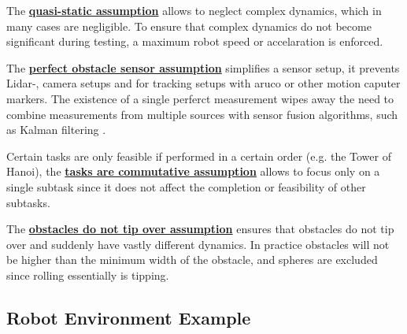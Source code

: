 The \hyperref[assumption:quasi_static]{\textbf{quasi-static assumption}} allows to neglect complex dynamics, which in many cases are negligible. To ensure that complex dynamics do not become significant during testing, a maximum robot speed or accelaration is enforced.\bs

The \hyperref[assumption:perfect_obstacle_sensor]{\textbf{perfect obstacle sensor assumption}} simplifies a sensor setup, it prevents Lidar-, camera setups and for tracking setups with aruco or other motion caputer markers. The existence of a single perferct measurement wipes away the need to combine measurements from multiple sources with sensor fusion algorithms, such as Kalman filtering \cite{verhaegen_filtering_2007}.\bs

Certain tasks are only feasible if performed in a certain order (e.g. the Tower of Hanoi), the \hyperref[assumption:order_does_not_matter]{\textbf{tasks are commutative assumption}} allows to focus only on a single subtask since it does not affect the completion or feasibility of other subtasks.\bs

The \hyperref[assumption:no_tipping]{\textbf{obstacles do not tip over assumption}} ensures that obstacles do not tip over and suddenly have vastly different dynamics. In practice obstacles will not be higher than the minimum width of the obstacle, and spheres are excluded since rolling essentially is tipping. 

\subsection{Robot Environment Example}

